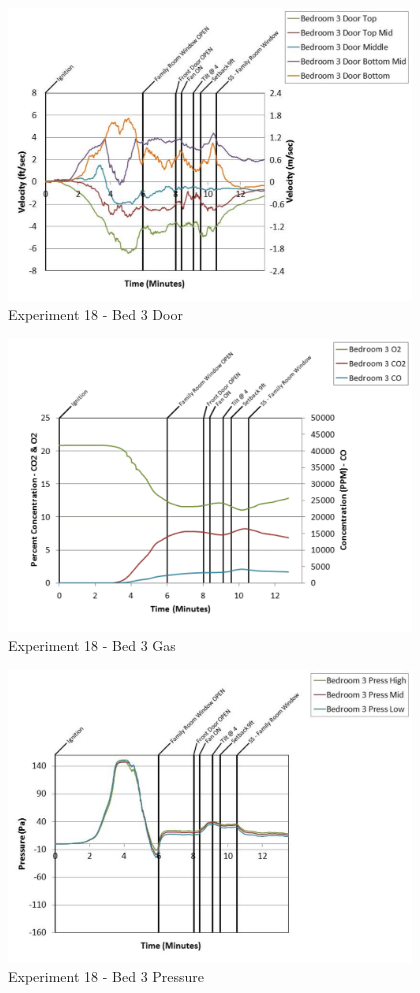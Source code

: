 \documentclass{article}
\begin{document}
\begin{appendices}
	\begin{figure}[h!]
		\centering
		\includegraphics[height=3.05in]{0_Images/Results_Charts/Exp_18_Charts/Bed3Door.pdf}
		\caption{Experiment 18 - Bed 3 Door}
	\end{figure}
 
	\clearpage

	\begin{figure}[h!]
		\centering
		\includegraphics[height=3.05in]{0_Images/Results_Charts/Exp_18_Charts/Bed3Gas.pdf}
		\caption{Experiment 18 - Bed 3 Gas}
	\end{figure}
 

	\begin{figure}[h!]
		\centering
		\includegraphics[height=3.05in]{0_Images/Results_Charts/Exp_18_Charts/Bed3Pressure.pdf}
		\caption{Experiment 18 - Bed 3 Pressure}
	\end{figure}
 

\end{appendices}
\end{document}
